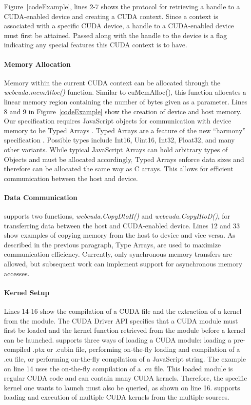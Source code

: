 Figure~\ref{codeExample}, lines 2-7 shows the protocol for
retrieving a handle to a CUDA-enabled device and creating a CUDA context. Since
a context is associated with a specific CUDA device, a handle to a CUDA-enabled
device must first be attained. Passed along with the handle to the device is a
flag indicating any special features this CUDA context is to have.

\paragraph{Memory Allocation} Memory within the current CUDA context can be
allocated through the \textit{webcuda.memAlloc()} function. Similar to
cuMemAlloc(), this function allocates a linear memory region containing the
number of bytes given as a parameter. Lines 8 and 9 in Figure~\ref{codeExample}
show the creation of device and host memory.  Our specification requires JavaScript objects
for communication with device memory to be Typed Arrays \cite{typedarray}.
Typed Arrays are a feature of the new ``harmony'' specification \cite{harmony}.
Possible types include Int16, Uint16, Int32, Float32, and many other variants.
While typical JavaScript Arrays can hold arbitrary types of Objects and must be
allocated accordingly, Typed Arrays enforce data sizes and therefore can be
allocated the same way as C arrays. This allows for efficient communication
between the host and device.


\paragraph{Data Communication} \name supports two functions,
\textit{webcuda.CopyDtoH()} and \textit{webcuda.CopyHtoD()}, for transferring
data between the host and CUDA-enabled device. Lines 12 and 33 show examples of
copying memory from the host to device and vice versa. As described in the
previous paragraph, Type Arrays, are used to maximize
communication efficiency. Currently, only synchronous memory transfers are
allowed, but subsequent work can implement support for asynchronous memory
accesses.

\paragraph{Kernel Setup} Lines 14-16 show the compilation of a CUDA file and the
extraction of a kernel from the module. The CUDA Driver API specifies that a
CUDA module must first be loaded and the kernel function retrieved from the
module before a kernel can be launched. \name supports three ways of loading a
CUDA module: loading a pre-compiled .ptx or .cubin file, performing on-the-fly
loading and compilation of a .cu file, or performing on-the-fly compilation of a
JavaScript string.  The example on line 14 uses the on-the-fly compilation of a
.cu file. This loaded module is regular CUDA code and can contain many CUDA
kernels.  Therefore, the specific kernel one wants to launch must also be
queried, as shown on line 16. \name supports loading and execution of
multiple CUDA kernels from the multiple sources.

